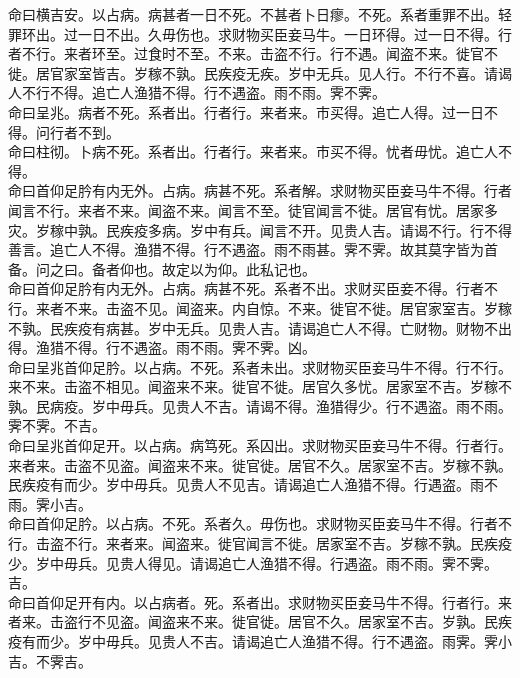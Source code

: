 \documentclass{zhvt-classic}
\begin{document}
\hspace*{2em}命曰横吉安。以占病。病甚者一日不死。不甚者卜日瘳。不死。系者重罪不出。轻罪环出。过一日不出。久毋伤也。求财物买臣妾马牛。一日环得。过一日不得。行者不行。来者环至。过食时不至。不来。击盗不行。行不遇。闻盗不来。徙官不徙。居官家室皆吉。岁稼不孰。民疾疫无疾。岁中无兵。见人行。不行不喜。请谒人不行不得。追亡人渔猎不得。行不遇盗。雨不雨。霁不霁。\\
\hspace*{2em}命曰呈兆。病者不死。系者出。行者行。来者来。市买得。追亡人得。过一日不得。问行者不到。\\
\hspace*{2em}命曰柱彻。卜病不死。系者出。行者行。来者来。市买不得。忧者毋忧。追亡人不得。\\
\hspace*{2em}命曰首仰足肣有内无外。占病。病甚不死。系者解。求财物买臣妾马牛不得。行者闻言不行。来者不来。闻盗不来。闻言不至。徒官闻言不徙。居官有忧。居家多灾。岁稼中孰。民疾疫多病。岁中有兵。闻言不开。见贵人吉。请谒不行。行不得善言。追亡人不得。渔猎不得。行不遇盗。雨不雨甚。霁不霁。故其莫字皆为首备。问之曰。备者仰也。故定以为仰。此私记也。\\
\hspace*{2em}命曰首仰足肣有内无外。占病。病甚不死。系者不出。求财买臣妾不得。行者不行。来者不来。击盗不见。闻盗来。内自惊。不来。徙官不徙。居官家室吉。岁稼不孰。民疾疫有病甚。岁中无兵。见贵人吉。请谒追亡人不得。亡财物。财物不出得。渔猎不得。行不遇盗。雨不雨。霁不霁。凶。\\
\hspace*{2em}命曰呈兆首仰足肣。以占病。不死。系者未出。求财物买臣妾马牛不得。行不行。来不来。击盗不相见。闻盗来不来。徙官不徙。居官久多忧。居家室不吉。岁稼不孰。民病疫。岁中毋兵。见贵人不吉。请谒不得。渔猎得少。行不遇盗。雨不雨。霁不霁。不吉。\\
\hspace*{2em}命曰呈兆首仰足开。以占病。病笃死。系囚出。求财物买臣妾马牛不得。行者行。来者来。击盗不见盗。闻盗来不来。徙官徙。居官不久。居家室不吉。岁稼不孰。民疾疫有而少。岁中毋兵。见贵人不见吉。请谒追亡人渔猎不得。行遇盗。雨不雨。霁小吉。\\
\hspace*{2em}命曰首仰足肣。以占病。不死。系者久。毋伤也。求财物买臣妾马牛不得。行者不行。击盗不行。来者来。闻盗来。徙官闻言不徙。居家室不吉。岁稼不孰。民疾疫少。岁中毋兵。见贵人得见。请谒追亡人渔猎不得。行遇盗。雨不雨。霁不霁。吉。\\
\hspace*{2em}命曰首仰足开有内。以占病者。死。系者出。求财物买臣妾马牛不得。行者行。来者来。击盗行不见盗。闻盗来不来。徙官徙。居官不久。居家室不吉。岁孰。民疾疫有而少。岁中毋兵。见贵人不吉。请谒追亡人渔猎不得。行不遇盗。雨霁。霁小吉。不霁吉。\\
\end{document}
